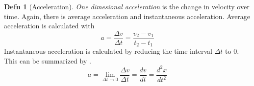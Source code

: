 \documentclass[10pt,letterpaper,final,twoside,notitlepage]{article}
\theoremstyle{plain}
\theoremstyle{definition}
\newtheorem{definition}{Defn}
\theoremstyle{remark}
\begin{document}
\begin{definition}[Acceleration] \label{def:1D Acceleration}
  \emph{One dimesional acceleration} is the change in velocity over time.
  Again, there is average acceleration and instantaneous acceleration.
  Average acceleration is calculated with 
  \begin{equation} \label{eq:1D Average Acceleration}
    a = \frac{\Delta v}{\Delta t} = \frac{v_{2} - v_{1}}{t_{2} - t_{1}}
  \end{equation}
  Instantaneous acceleration is calculated by reducing the time interval $\Delta t$ to 0.
  This can be summarized by .
  \begin{equation} \label{eq:1D Instantaneous Acceleration}
    a = \lim\limits_{\Delta t \rightarrow 0} \frac{\Delta v}{\Delta t} = \frac{dv}{dt} = \frac{d^{2}x}{dt^{2}}
  \end{equation}
\end{definition}

\appendix
{}

\clearpage


\clearpage


\clearpage


\clearpage

\end{document}
